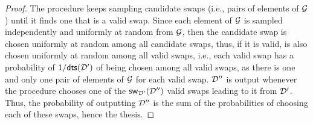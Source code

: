 \begin{proof}
  The procedure keeps sampling candidate swaps (i.e., pairs of elements of
  $\mathcal{G}$) until it finds one that is a valid swap. Since each element of
  $\mathcal{G}$ is sampled independently and uniformly at random from $\mathcal{G}$,
  then the candidate swap is chosen uniformly at random among all candidate
  swaps, thus, if it is valid, is also chosen uniformly at random among all
  valid swaps, i.e., each valid swap has a probability of
  $1/\mathsf{dts}\lparen\mathcal{D}'\rparen$ of being chosen among all valid swaps, as
  there is one and only one pair of elements of $\mathcal{G}$ for each valid swap.
  $\mathcal{D}''$ is output whenever the procedure chooses one of the
  $\mathsf{sw}_{\mathcal{D}'}\lparen\mathcal{D}''\rparen$ valid swaps leading to it from
  $\mathcal{D}'$. Thus, the probability of outputting $\mathcal{D}''$ is the sum of
  the probabilities of choosing each of these swaps, hence the thesis.
\end{proof}

